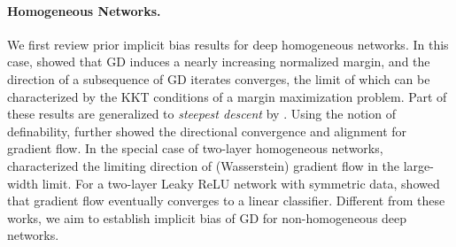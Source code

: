 \paragraph{Homogeneous Networks.}
We first review prior implicit bias results for deep homogeneous networks. 
In this case, \citet{lyu2020gradient} showed that GD induces a nearly increasing normalized margin, and the direction of a subsequence of GD iterates converges, the limit of which can be characterized by the KKT conditions of a margin maximization problem. 
Part of these results are generalized to \emph{steepest descent} by  \citet{tsilivis2024flavors}.
Using the notion of definability, \citet{ji2020directional} further showed the directional convergence and alignment for gradient flow. 
In the special case of two-layer homogeneous networks, \citet{chizat2020implicit} characterized the limiting direction of (Wasserstein) gradient flow in the large-width limit.
For a two-layer Leaky ReLU network with symmetric data, \citet{lyu2021gradient} showed that gradient flow eventually converges to a linear classifier. 
Different from these works, we aim to establish implicit bias of GD for non-homogeneous deep networks. 

